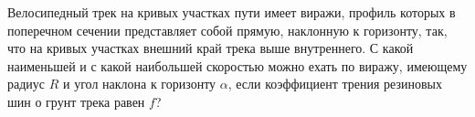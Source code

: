 Велосипедный трек на кривых участках пути имеет виражи,
профиль которых в поперечном сечении представляет собой прямую,
наклонную к горизонту, так, что на кривых участках
внешний край трека выше внутреннего.
С какой наименьшей и с какой наибольшей скоростью можно ехать по виражу,
имеющему радиус $R$ и угол наклона к горизонту $\alpha$,
если коэффициент трения резиновых шин о грунт трека равен $f$?
